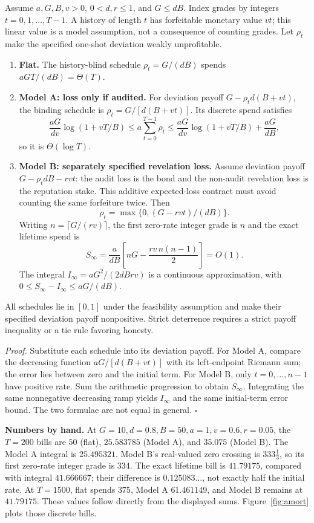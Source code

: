 \documentclass[11pt,a4paper]{article}
\begin{document}
\begin{thebox}
\begin{theorem}[Amortization]\label{thm:amort}
Assume $a,G,B,v>0$, $0<d,r\le1$, and $G\le dB$. Index grades by integers $t=0,1,\ldots,T-1$. A history of length $t$ has forfeitable monetary value $vt$; this linear value is a model assumption, not a consequence of counting grades. Let $\rho_t$ make the specified one-shot deviation weakly unprofitable.
\begin{enumerate}[leftmargin=1.6em,itemsep=1pt]
\item \textbf{Flat.} The history-blind schedule $\rho_t=G/(dB)$ spends $aGT/(dB)=\Theta(T)$.
\item \textbf{Model A: loss only if audited.} For deviation payoff $G-\rho_t d(B+vt)$, the binding schedule is $\rho_t=G/[d(B+vt)]$. Its discrete spend satisfies
\[
 \frac{aG}{dv}\log(1+vT/B)
 \le a\sum_{t=0}^{T-1}\rho_t
 \le\frac{aG}{dv}\log(1+vT/B)+\frac{aG}{dB},
\]
so it is $\Theta(\log T)$.
\item \textbf{Model B: separately specified revelation loss.} Assume deviation payoff $G-\rho_t dB-rvt$: the audit loss is the bond and the non-audit revelation loss is the reputation stake. This additive expected-loss contract must avoid counting the same forfeiture twice. Then
\[
 \rho_t=\max\{0,(G-rvt)/(dB)\}.
\]
Writing $n=\lceil G/(rv)\rceil$, the first zero-rate integer grade is $n$ and the exact lifetime spend is
\[
 S_\infty=\frac{a}{dB}\left[nG-\frac{rv\,n(n-1)}2\right]=O(1).
\]
The integral $I_\infty=aG^2/(2dBrv)$ is a continuous approximation, with $0\le S_\infty-I_\infty\le aG/(dB)$.
\end{enumerate}
All schedules lie in $[0,1]$ under the feasibility assumption and make their specified deviation payoff nonpositive. Strict deterrence requires a strict payoff inequality or a tie rule favoring honesty.
\end{theorem}
\end{thebox}

\emph{Proof.} Substitute each schedule into its deviation payoff. For Model A, compare the decreasing function $aG/[d(B+vt)]$ with its left-endpoint Riemann sum; the error lies between zero and the initial term. For Model B, only $t=0,\ldots,n-1$ have positive rate. Sum the arithmetic progression to obtain $S_\infty$. Integrating the same nonnegative decreasing ramp yields $I_\infty$ and the same initial-term error bound. The two formulae are not equal in general. \hfill$\square$

\textbf{Numbers by hand.} At $G=10,d=0.8,B=50,a=1,v=0.6,r=0.05$, the $T=200$ bills are $50$ (flat), $25.583785$ (Model A), and $35.075$ (Model B). The Model A integral is $25.495321$. Model B's real-valued zero crossing is $333\tfrac13$, so its first zero-rate integer grade is $334$. The exact lifetime bill is $41.79175$, compared with integral $41.666667$; their difference is $0.125083\ldots$, not exactly half the initial rate. At $T=1500$, flat spends $375$, Model A $61.461149$, and Model B remains at $41.79175$. These values follow directly from the displayed sums. Figure~\ref{fig:amort} plots those discrete bills.
\end{document}
